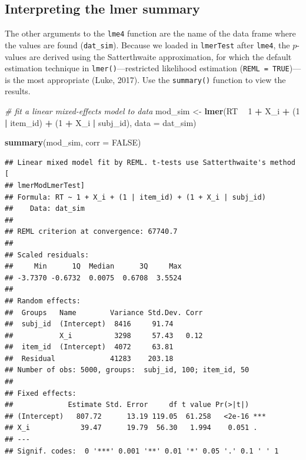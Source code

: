 \documentclass[
  english,
  doc,floatsintext]{apa6}
\newenvironment{Shaded}{\begin{snugshade}}{\end{snugshade}}
\newcommand{\CommentTok}[1]{\textcolor[rgb]{0.56,0.35,0.01}{\textit{#1}}}
\newcommand{\DataTypeTok}[1]{\textcolor[rgb]{0.13,0.29,0.53}{#1}}
\newcommand{\DecValTok}[1]{\textcolor[rgb]{0.00,0.00,0.81}{#1}}
\newcommand{\KeywordTok}[1]{\textcolor[rgb]{0.13,0.29,0.53}{\textbf{#1}}}
\newcommand{\NormalTok}[1]{#1}
\newcommand{\OperatorTok}[1]{\textcolor[rgb]{0.81,0.36,0.00}{\textbf{#1}}}
\newcommand{\OtherTok}[1]{\textcolor[rgb]{0.56,0.35,0.01}{#1}}
\newcommand{\StringTok}[1]{\textcolor[rgb]{0.31,0.60,0.02}{#1}}
\begin{document}
\hypertarget{interpreting-the-lmer-summary}{%
\subsection{Interpreting the lmer summary}\label{interpreting-the-lmer-summary}}

The other arguments to the \texttt{lme4} function are the name of the data frame where the values are found (\texttt{dat\_sim}). Because we loaded in \texttt{lmerTest} after \texttt{lme4}, the \(p\)-values are derived using the Satterthwaite approximation, for which the default estimation technique in \texttt{lmer()}---restricted likelihood estimation (\texttt{REML\ =\ TRUE})---is the most appropriate (Luke, 2017). Use the \texttt{summary()} function to view the results.

\begin{Shaded}
\begin{Highlighting}[]
\CommentTok{# fit a linear mixed-effects model to data}
\NormalTok{mod_sim <-}\StringTok{ }\KeywordTok{lmer}\NormalTok{(RT }\OperatorTok{~}\StringTok{ }\DecValTok{1} \OperatorTok{+}\StringTok{ }\NormalTok{X_i }\OperatorTok{+}\StringTok{ }\NormalTok{(}\DecValTok{1} \OperatorTok{|}\StringTok{ }\NormalTok{item_id) }\OperatorTok{+}\StringTok{ }\NormalTok{(}\DecValTok{1} \OperatorTok{+}\StringTok{ }\NormalTok{X_i }\OperatorTok{|}\StringTok{ }\NormalTok{subj_id),}
                \DataTypeTok{data =}\NormalTok{ dat_sim)}

\KeywordTok{summary}\NormalTok{(mod_sim, }\DataTypeTok{corr =} \OtherTok{FALSE}\NormalTok{)}
\end{Highlighting}
\end{Shaded}

\begin{verbatim}
## Linear mixed model fit by REML. t-tests use Satterthwaite's method [
## lmerModLmerTest]
## Formula: RT ~ 1 + X_i + (1 | item_id) + (1 + X_i | subj_id)
##    Data: dat_sim
## 
## REML criterion at convergence: 67740.7
## 
## Scaled residuals: 
##     Min      1Q  Median      3Q     Max 
## -3.7370 -0.6732  0.0075  0.6708  3.5524 
## 
## Random effects:
##  Groups   Name        Variance Std.Dev. Corr
##  subj_id  (Intercept)  8416     91.74       
##           X_i          3298     57.43   0.12
##  item_id  (Intercept)  4072     63.81       
##  Residual             41283    203.18       
## Number of obs: 5000, groups:  subj_id, 100; item_id, 50
## 
## Fixed effects:
##             Estimate Std. Error     df t value Pr(>|t|)    
## (Intercept)   807.72      13.19 119.05  61.258   <2e-16 ***
## X_i            39.47      19.79  56.30   1.994    0.051 .  
## ---
## Signif. codes:  0 '***' 0.001 '**' 0.01 '*' 0.05 '.' 0.1 ' ' 1
\end{verbatim}
\end{document}

